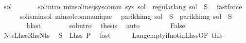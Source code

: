\begin{isabellebody}
\ sol{\isacharprime}{\kern0pt}\ \isanewline
\ \ \ \ \ \ sol{\isacharprime}{\kern0pt}{\isacharunderscore}{\kern0pt}intro{\isacharcolon}{\kern0pt}\ {\isachardoublequoteopen}min{\isacharunderscore}{\kern0pt}sol{\isacharunderscore}{\kern0pt}ineq{\isacharunderscore}{\kern0pt}sys{\isacharunderscore}{\kern0pt}comm\ sys\ sol{\isacharprime}{\kern0pt}\ {\isasymand}\ regular{\isacharunderscore}{\kern0pt}lang\ {\isacharparenleft}{\kern0pt}sol{\isacharprime}{\kern0pt}\ {\isacharparenleft}{\kern0pt}{\isasymgamma}{\isacharprime}{\kern0pt}\ S{\isacharparenright}{\kern0pt}{\isacharparenright}{\kern0pt}{\isachardoublequoteclose}\ \isamarkupfalse%
\ fastforce\isanewline
\ \ \ \ \isamarkupfalse%
\ sol{\isacharunderscore}{\kern0pt}is{\isacharunderscore}{\kern0pt}min{\isacharunderscore}{\kern0pt}sol\ min{\isacharunderscore}{\kern0pt}sol{\isacharunderscore}{\kern0pt}comm{\isacharunderscore}{\kern0pt}unique\ \isamarkupfalse%
\ {\isachardoublequoteopen}parikh{\isacharunderscore}{\kern0pt}img\ {\isacharparenleft}{\kern0pt}{\isacharquery}{\kern0pt}sol\ {\isacharparenleft}{\kern0pt}{\isasymgamma}{\isacharprime}{\kern0pt}\ S{\isacharparenright}{\kern0pt}{\isacharparenright}{\kern0pt}\ {\isacharequal}{\kern0pt}\ parikh{\isacharunderscore}{\kern0pt}img\ {\isacharparenleft}{\kern0pt}sol{\isacharprime}{\kern0pt}\ {\isacharparenleft}{\kern0pt}{\isasymgamma}{\isacharprime}{\kern0pt}\ S{\isacharparenright}{\kern0pt}{\isacharparenright}{\kern0pt}{\isachardoublequoteclose}\isanewline
\ \ \ \ \ \ \isamarkupfalse%
\ blast\isanewline
\ \ \ \ \isamarkupfalse%
\ {\isacharasterisk}{\kern0pt}\ {\isacharasterisk}{\kern0pt}{\isacharasterisk}{\kern0pt}{\isacharasterisk}{\kern0pt}\ sol{\isacharprime}{\kern0pt}{\isacharunderscore}{\kern0pt}intro\ \isamarkupfalse%
\ {\isacharquery}{\kern0pt}thesis\ \isamarkupfalse%
\ auto\isanewline
\ \ \isamarkupfalse%
\isanewline
\ \ \ \ \isamarkupfalse%
\ False\isanewline
\ \ \ \ \isamarkupfalse%
\ Nts{\isacharunderscore}{\kern0pt}Lhss{\isacharunderscore}{\kern0pt}Rhs{\isacharunderscore}{\kern0pt}Nts\ \isamarkupfalse%
\ {\isachardoublequoteopen}S\ {\isasymnotin}\ Lhss\ P{\isachardoublequoteclose}\ \isamarkupfalse%
\ fast\isanewline
\ \ \ \ \isamarkupfalse%
\ Lang{\isacharunderscore}{\kern0pt}empty{\isacharunderscore}{\kern0pt}if{\isacharunderscore}{\kern0pt}notin{\isacharunderscore}{\kern0pt}Lhss{\isacharbrackleft}{\kern0pt}OF\ this{\isacharbrackright}{\kern0pt}\ {\isacharasterisk}{\kern0pt}\ \isamarkupfalse%

\end{isabellebody}
